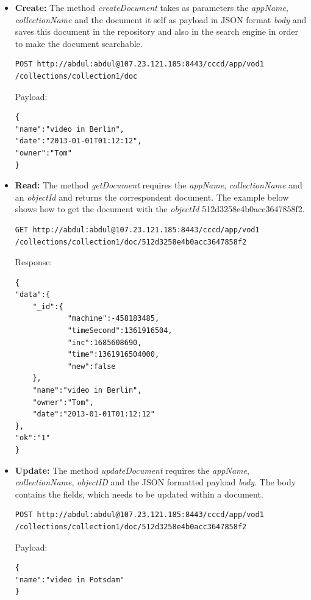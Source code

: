 \begin{itemize}
\item \textbf{Create:} The method \textit{createDocument} takes as parameters  the \textit{appName}, \textit{collectionName} and  the document it self as payload in \ac{JSON} format \textit{body} and saves this document in the repository and also in the search engine in order to make the document searchable.  

\begin{code}
\begin{verbatim}
POST http://abdul:abdul@107.23.121.185:8443/cccd/app/vod1
/collections/collection1/doc
\end{verbatim}
Payload:
\begin{verbatim}
{
"name":"video in Berlin",
"date":"2013-01-01T01:12:12",
"owner":"Tom"
}
\end{verbatim}
\end{code}


\item \textbf{Read:} The method \textit{getDocument} requires the \textit{appName}, \textit{collectionName} and an \textit{objectId} and returns the correspondent document. The example below shows how to get the document with the \textit{objectId} 512d3258e4b0acc3647858f2.

\begin{code}
\begin{verbatim}
GET http://abdul:abdul@107.23.121.185:8443/cccd/app/vod1
/collections/collection1/doc/512d3258e4b0acc3647858f2
\end{verbatim}
Response:
\begin{verbatim}
{
"data":{
	"_id":{
			"machine":-458183485,
			"timeSecond":1361916504,
			"inc":1685608690,
			"time":1361916504000,
			"new":false
	},
	"name":"video in Berlin",
	"owner":"Tom",
	"date":"2013-01-01T01:12:12"
},
"ok":"1"
}
\end{verbatim}
\end{code}

\item \textbf{Update:} The method \textit{updateDocument} requires the \textit{appName}, \textit{collectionName}, \textit{objectID} and the \ac{JSON} formatted payload \textit{body}. The body contains  the fields, which needs to be updated within a document.

\begin{code}
\begin{verbatim}
POST http://abdul:abdul@107.23.121.185:8443/cccd/app/vod1
/collections/collection1/doc/512d3258e4b0acc3647858f2
\end{verbatim}
Payload:
\begin{verbatim}
{
"name":"video in Potsdam"
}
\end{verbatim}
\end{code}


\end{itemize}
